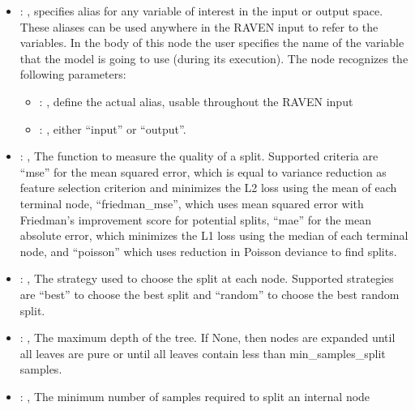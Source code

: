 \begin{itemize}
    \item {}: , 
      specifies alias for         any variable of interest in the input or output space. These
      aliases can be used anywhere in the RAVEN input to         refer to the variables. In the body
      of this node the user specifies the name of the variable that the model is going to use
      (during its execution).
      The  node recognizes the following parameters:
        \begin{itemize}
          \item {}: , 
            define the actual alias, usable throughout the RAVEN input
          \item {}: , 
            either ``input'' or ``output''.
      \end{itemize}

    \item {}: , 
      The function to measure the quality of a split. Supported criteria are ``mse'' for the mean
      squared error,                                                  which is equal to variance
      reduction as feature selection criterion and minimizes the L2 loss using the mean of each
      terminal node, ``friedman\_mse'', which uses mean squared error with Friedman's improvement
      score for potential splits,                                                  ``mae'' for the
      mean absolute error, which minimizes the L1 loss using the median of each terminal node, and
      ``poisson''                                                  which uses reduction in Poisson
      deviance to find splits.

    \item {}: , 
      The strategy used to choose the split at each node. Supported strategies are ``best''
      to choose the best split and ``random'' to choose the best random split.

    \item {}: , 
      The maximum depth of the tree. If None, then nodes are expanded until all leaves are pure
      or until all leaves contain less than min\_samples\_split samples.

    \item {}: , 
      The minimum number of samples required to split an internal node


\end{itemize}
